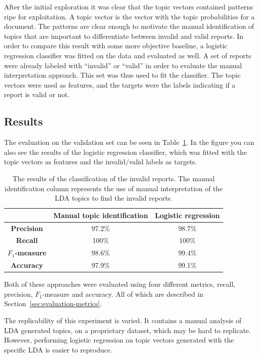 After the initial exploration it was clear that the topic vectors contained patterns ripe for exploitation.
A topic vector is the vector with the topic probabilities for a document.
The patterns are clear enough to motivate the manual identification of topics that are important to differentiate between invalid and valid reports.
In order to compare this result with some more objective baseline, a logistic regression classifier was fitted on the data and evaluated as well.
A set of reports were already labeled with ``invalid'' or ``valid'' in order to evaluate the manual interpretation approach.
This set was thus used to fit the classifier.
The topic vectors were used as features, and the targets were the labels indicating if a report is valid or not.

\subsection{Results}

The evaluation on the validation set can be seen in Table~\ref{tab:exp1-eval}.
In the figure you can also see the results of the logistic regression classifier, which was fitted with the topic vectors as features and the invalid/valid labels as targets.

\begin{table}[h!]
    \centering
    \begin{tabular}{|c|cc|}
        \hline
        & \textbf{Manual topic identification} & \textbf{Logistic regression} \\
        \hline
        \textbf{Precision} & 97.2\% & 98.7\% \\
        \textbf{Recall} & 100\% & 100\% \\
        \textbf{$F_1$-measure} & 98.6\% & 99.4\%\\
        \textbf{Accuracy} & 97.9\% & 99.1\%\\
        \hline
    \end{tabular}
    \caption{The results of the classification of the invalid reports. The manual identification column represents the use of manual interpretation of the LDA topics to find the invalid reports.}
    \label{tab:exp1-eval}
\end{table}

Both of these approaches were evaluated using four different metrics, recall, precision, $F_1$-measure and accuracy.
All of which are described in Section~\ref{sec:evaluation-metrics}.

The replicability of this experiment is varied.
It contains a manual analysis of LDA generated topics, on a proprietary dataset, which may be hard to replicate.
However, performing logistic regression on topic vectors generated with the specific LDA is easier to reproduce.

